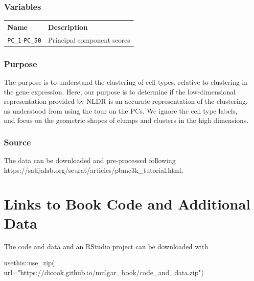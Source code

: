 \documentclass[
  letterpaper,
]{krantz}
\newenvironment{Shaded}{\begin{snugshade}}{\end{snugshade}}
\newcommand{\AttributeTok}[1]{\textcolor[rgb]{0.40,0.45,0.13}{#1}}
\newcommand{\FunctionTok}[1]{\textcolor[rgb]{0.28,0.35,0.67}{#1}}
\newcommand{\NormalTok}[1]{\textcolor[rgb]{0.00,0.23,0.31}{#1}}
\newcommand{\SpecialCharTok}[1]{\textcolor[rgb]{0.37,0.37,0.37}{#1}}
\newcommand{\StringTok}[1]{\textcolor[rgb]{0.13,0.47,0.30}{#1}}
\begin{document}
\subsection*{Variables}\label{variables-14}

\begin{longtable}[]{@{}ll@{}}
\toprule\noalign{}
Name & Description \\
\midrule\noalign{}
\endhead
\bottomrule\noalign{}
\endlastfoot
\texttt{PC\_1}-\texttt{PC\_50} & Principal component scores \\
\end{longtable}

\subsection*{Purpose}\label{purpose-14}

The purpose is to understand the clustering of cell types, relative to
clustering in the gene expression. Here, our purpose is to determine if
the low-dimensional representation provided by NLDR is an accurate
representation of the clustering, as understood from using the tour on
the PCs. We ignore the cell type labels, and focus on the geometric
shapes of clumps and clusters in the high dimensions.

\subsection*{Source}\label{source-14}

The data can be downloaded and pre-processed following
https://satijalab.org/seurat/articles/pbmc3k\_tutorial.html.

\chapter{Links to Book Code and Additional Data}\label{book-data}

The code and data and an RStudio project can be downloaded with

\begin{Shaded}
\begin{Highlighting}[]
\NormalTok{usethis}\SpecialCharTok{::}\FunctionTok{use\_zip}\NormalTok{(}
  \AttributeTok{url=}\StringTok{"https://dicook.github.io/mulgar\_book/code\_and\_data.zip"}\NormalTok{)}
\end{Highlighting}
\end{Shaded}
\end{document}
